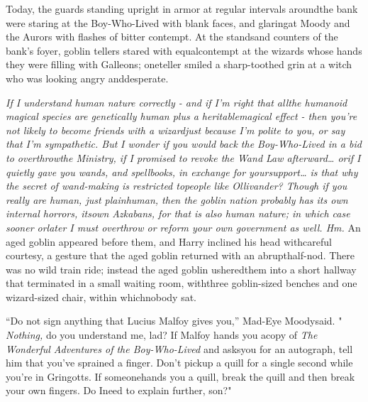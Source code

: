 Today, the guards standing upright in armor at regular intervals aroundthe bank were staring at the Boy-Who-Lived with blank faces, and glaringat Moody and the Aurors with flashes of bitter contempt. At the standsand counters of the bank's foyer, goblin tellers stared with equalcontempt at the wizards whose hands they were filling with Galleons; oneteller smiled a sharp-toothed grin at a witch who was looking angry anddesperate.

\emph{If I understand human nature correctly - and if I'm right that allthe humanoid magical species are genetically human plus a heritablemagical effect - then you're not likely to become friends with a wizardjust because I'm polite to you, or say that I'm sympathetic. But}
\emph{I wonder if you would back the Boy-Who-Lived in a bid to overthrowthe Ministry, if I promised to revoke the Wand Law afterward\ldots{} orif I quietly gave you wands, and spellbooks, in exchange for yoursupport\ldots{} is that why the secret of wand-making is restricted topeople like Ollivander? Though if you really are human, just plainhuman, then the goblin nation probably has its own internal horrors, itsown Azkabans, for that is also human nature; in which case sooner orlater I must overthrow or reform your own government as well. Hm.}
An aged goblin appeared before them, and Harry inclined his head withcareful courtesy, a gesture that the aged goblin returned with an abrupthalf-nod. There was no wild train ride; instead the aged goblin usheredthem into a short hallway that terminated in a small waiting room, withthree goblin-sized benches and one wizard-sized chair, within whichnobody sat.

``Do not sign anything that Lucius Malfoy gives you,'' Mad-Eye Moodysaid. " \emph{Nothing,} do you understand me, lad? If Malfoy hands you acopy of \emph{The Wonderful Adventures of the Boy-Who-Lived} and asksyou for an autograph, tell him that you've sprained a finger. Don't pickup a quill for a single second while you're in Gringotts. If someonehands you a quill, break the quill and then break your own fingers. Do Ineed to explain further, son?"

